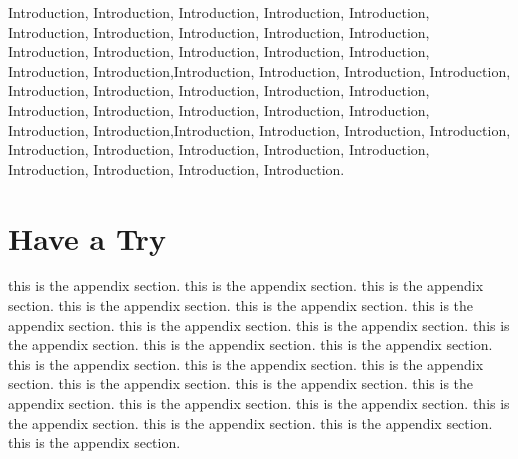 Introduction, Introduction, Introduction, Introduction, Introduction, Introduction, Introduction, Introduction, Introduction, Introduction, Introduction, Introduction, Introduction, Introduction, Introduction, Introduction, Introduction,Introduction, Introduction, Introduction, Introduction, Introduction, Introduction, Introduction, Introduction, Introduction, Introduction, Introduction, Introduction, Introduction, Introduction, Introduction, Introduction,Introduction, Introduction, Introduction, Introduction, Introduction, Introduction, Introduction, Introduction, Introduction, Introduction, Introduction, Introduction, Introduction.

\section{Have a Try}

this is the appendix section. this is the appendix section. this is the appendix section. this is the appendix section. this is the appendix section. this is the appendix section. this is the appendix section. this is the appendix section. this is the appendix section. this is the appendix section. this is the appendix section. this is the appendix section. this is the appendix section. this is the appendix section. this is the appendix section. this is the appendix section. this is the appendix section. this is the appendix section. this is the appendix section. this is the appendix section. this is the appendix section. this is the appendix section. this is the appendix section.
